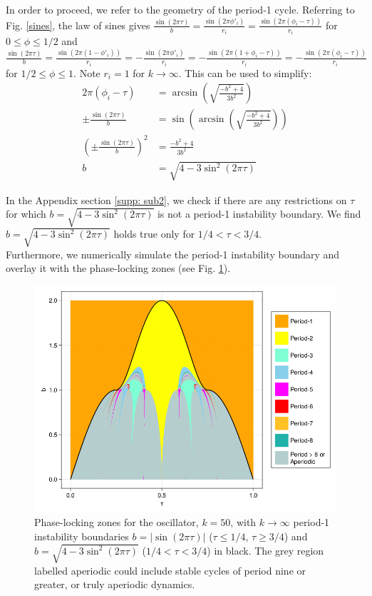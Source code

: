 \indent In order to proceed, we refer to the geometry of the period-1 cycle. Referring to Fig. \ref{sines}, the law of sines gives $\frac{\sin(2\pi \tau)}{b}=\frac{\sin(2\pi \phi'_i)}{r_i}=\frac{\sin(2\pi (\phi_i -\tau))}{r_i}$ for $0\leq \phi \leq1/2$ and $\frac{\sin(2\pi \tau)}{b}=\frac{\sin(2\pi (1-\phi'_i))}{r_i}=-\frac{\sin(2\pi \phi'_i)}{r_i}=-\frac{\sin(2\pi (1+\phi_i-\tau))}{r_i}=-\frac{\sin(2\pi (\phi_i-\tau))}{r_i}$ for $1/2\leq \phi \leq1$. Note $r_i=1$ for $k\rightarrow \infty$. This can be used to simplify:
\begin{align}
    2\pi(\phi_i - \tau) &= \arcsin(\sqrt{\frac{-b^2+4}{3b^2}}) \nonumber \\
    \pm\frac{\sin(2\pi \tau)}{b} &= \sin(\arcsin(\sqrt{\frac{-b^2+4}{3b^2}}))\nonumber \\
    (\pm\frac{\sin(2\pi \tau)}{b})^2 &= \frac{-b^2+4}{3b^2} \nonumber \\
    b &= \sqrt{4-3\sin^2(2\pi\tau)} 
    \label{eq:bound2}
\end{align}

In the Appendix section \ref{supp: sub2}, we check if there are any restrictions on $\tau$ for which $b = \sqrt{4-3\sin^2(2\pi\tau)}$ is not a period-1 instability boundary. We find $b = \sqrt{4-3\sin^2(2\pi\tau)}$ holds true only for $1/4<\tau<3/4$.\\

Furthermore, we numerically simulate the period-1 instability boundary and overlay it with the phase-locking zones (see Fig. \ref{p1-instab}). 

\begin{figure}[H]
    \begin{center}
    \includegraphics[width=.8\textwidth]{../plots/big_plot_w_line.png}
    \end{center}
    \caption{Phase-locking zones for the oscillator, $k=50$, with $k\rightarrow \infty$ period-1 instability boundaries $b = |\sin(2\pi\tau)|$ ($\tau \leq 1/4$, $\tau \geq 3/4$) and $b = \sqrt{4-3\sin^2(2\pi\tau)}$ ($1/4<\tau<3/4$) in black. The grey region labelled aperiodic could include stable cycles of period nine or greater, or truly aperiodic dynamics.}
    \label{p1-instab}
\end{figure}

